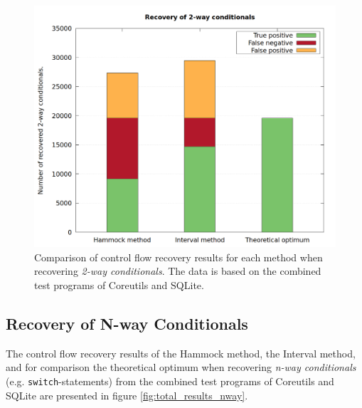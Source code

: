 \begin{figure}[htbp]
	\centering
	\includegraphics[width=\textwidth]{inc/5_results/results_2-way.png}
	\caption{Comparison of control flow recovery results for each method when recovering \textit{2-way conditionals}. The data is based on the combined test programs of Coreutils and SQLite.}
	\label{fig:total_results_2way}
\end{figure}

\clearpage

\subsection{Recovery of N-way Conditionals}

The control flow recovery results of the Hammock method, the Interval method, and for comparison the theoretical optimum when recovering \textit{n-way conditionals} (e.g. \texttt{switch}-statements) from the combined test programs of Coreutils and SQLite are presented in figure \ref{fig:total_results_nway}.

